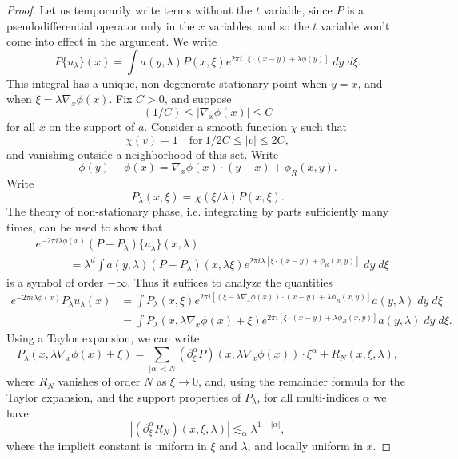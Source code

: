 \documentclass{article}
\theoremstyle{plain}
\theoremstyle{remark}
\theoremstyle{definition}
\begin{document}
\begin{proof}
	Let us temporarily write terms without the $t$ variable, since $P$ is a pseudodifferential operator only in the $x$ variables, and so the $t$ variable won't come into effect in the argument. We write
	\[ P \{ u_\lambda \} (x) = \int a(y,\lambda) P(x, \xi) e^{2 \pi i [ \xi \cdot (x - y) + \lambda \phi(y) ]}\; dy\; d\xi. \]
	This integral has a unique, non-degenerate stationary point when $y = x$, and when $\xi = \lambda \nabla_x \phi(x)$. Fix $C > 0$, and suppose
	\[ (1/C) \leq |\nabla_x \phi(x)| \leq C \]
	for all $x$ on the support of $a$. Consider a smooth function $\chi$ such that
	\[ \chi(v) = 1 \quad\text{for}\ 1/2C \leq |v| \leq 2C, \]
	and vanishing outside a neighborhood of this set. Write
	\[ \phi(y) - \phi(x) = \nabla_x \phi(x) \cdot (y - x) + \phi_R(x,y). \]
	Write
	\[ P_\lambda(x,\xi) = \chi(\xi / \lambda) P(x,\xi). \]
	The theory of non-stationary phase, i.e. integrating by parts sufficiently many times, can be used to show that
	\begin{align*}
		& e^{- 2 \pi i \lambda \phi(x) } (P - P_\lambda) \{ u_\lambda \} (x,\lambda)\\
		& \quad\quad\quad = \lambda^d \int a(y,\lambda) (P - P_\lambda)(x,\lambda \xi) e^{2 \pi i \lambda [ \xi \cdot (x - y) + \phi_R(x,y) ]}\; dy\; d\xi
	\end{align*}
	is a symbol of order $-\infty$. Thus it suffices to analyze the quantities
	\begin{align*}
		e^{-2 \pi i \lambda \phi(x)} P_\lambda u_\lambda(x) &= \int P_\lambda(x, \xi) e^{2 \pi i [ (\xi - \lambda \nabla_x \phi(x)) \cdot (x - y) + \lambda \phi_R(x,y) ]} a(y, \lambda)\; dy\; d\xi\\
		&= \int P_\lambda(x, \lambda \nabla_x \phi(x) + \xi) e^{2 \pi i [ \xi \cdot (x - y) + \lambda \phi_R(x,y) ]} a(y,\lambda)\; dy\; d\xi.
	\end{align*}
	Using a Taylor expansion, we can write
	\[ P_\lambda(x, \lambda \nabla_x \phi(x) + \xi) = \sum_{|\alpha| < N} (\partial_\xi^\alpha P)(x, \lambda \nabla_x \phi(x)) \cdot \xi^\alpha + R_N(x,\xi,\lambda), \]
	where $R_N$ vanishes of order $N$ as $\xi \to 0$, and, using the remainder formula for the Taylor expansion, and the support properties of $P_\lambda$, for all multi-indices $\alpha$ we have
	\[ |(\partial_\xi^\alpha R_N)(x,\xi,\lambda)| \lesssim_\alpha \lambda^{1 - |\alpha|}, \]
	where the implicit constant is uniform in $\xi$ and $\lambda$, and locally uniform in $x$.

\end{proof}
\end{document}
